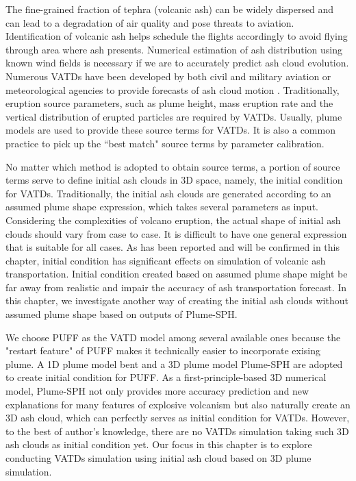 The fine-grained fraction of tephra (volcanic ash) can be widely dispersed and can lead to a degradation of air quality and pose threats to aviation. Identification of volcanic ash helps schedule the flights accordingly to avoid flying through area where ash presents. Numerical estimation of ash distribution using known wind fields is necessary if we are to accurately predict ash cloud evolution. Numerous VATDs have been developed by both civil and military aviation or meteorological agencies to provide forecasts of ash cloud motion \citep{witham2007comparison}. Traditionally, eruption source parameters, such as plume height, mass eruption rate and the vertical distribution of erupted particles are required by VATDs. Usually, plume models are used to provide these source terms for VATDs. It is also a common practice to pick up the ``best match" source terms by parameter calibration. 

No matter which method is adopted to obtain source terms, a portion of source terms serve to define initial ash clouds in 3D space, namely, the initial condition for VATDs. Traditionally, the initial ash clouds are generated according to an assumed plume shape expression, which takes several parameters as input. Considering the complexities of volcano eruption, the actual shape of initial ash clouds should vary from case to case. It is difficult to have one general expression that is suitable for all cases. As has been reported and will be confirmed in this chapter, initial condition has significant effects on simulation of volcanic ash transportation. Initial condition created based on assumed plume shape might be far away from realistic and impair the accuracy of ash transportation forecast. In this chapter, we investigate another way of creating the initial ash clouds without assumed plume shape based on outputs of Plume-SPH.

We choose PUFF \citep{searcy1998puff} as the VATD model among several available ones \citep[e.g.][]{searcy1998puff,schwaiger2012ash3d} because the "restart feature" of PUFF makes it technically easier to incorporate exising plume. A 
1D plume model bent \citep[e.g.][]{bursik2001effect} and a 3D plume model
Plume-SPH \citep{gmd-2017-119} are adopted to create initial condition for PUFF. As a first-principle-based 3D numerical model, Plume-SPH not only provides more accuracy prediction and new explanations for many features of explosive volcanism but also naturally create an 3D ash cloud, which can perfectly serves as initial condition for VATDs. However, to the best of author's knowledge, there are no VATDs simulation taking such 3D ash clouds as initial condition yet. Our focus in this chapter is to explore conducting VATDs simulation using initial ash cloud based on 3D plume simulation.


